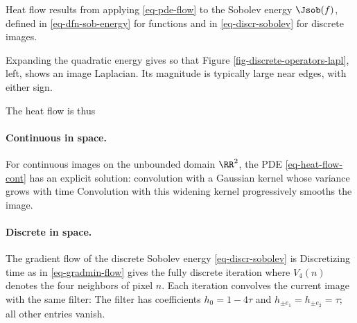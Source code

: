 Heat flow results from applying \eqref{eq-pde-flow} to the Sobolev energy $\Jsob(f)$, defined in \eqref{eq-dfn-sob-energy} for functions and in \eqref{eq-discr-sobolev} for discrete images.

Expanding the quadratic energy gives
so that 
Figure \ref{fig-discrete-operators-lapl}, left, shows an image Laplacian. Its magnitude is typically large near edges, with either sign.

The heat flow is thus 


  
\paragraph{Continuous in space.}

For continuous images on the unbounded domain $\RR^2$, the PDE \eqref{eq-heat-flow-cont} has an explicit solution: convolution with a Gaussian kernel whose variance grows with time
Convolution with this widening kernel progressively smooths the image.

  
\paragraph{Discrete in space.}

The gradient flow of the discrete Sobolev energy \eqref{eq-discr-sobolev} is
Discretizing time as in \eqref{eq-gradmin-flow} gives the fully discrete iteration
where $V_4(n)$ denotes the four neighbors of pixel $n$. Each iteration convolves the current image with the same filter:
The filter has coefficients $h_0=1-4\tau$ and $h_{\pm e_1}=h_{\pm e_2}=\tau$; all other entries vanish.

